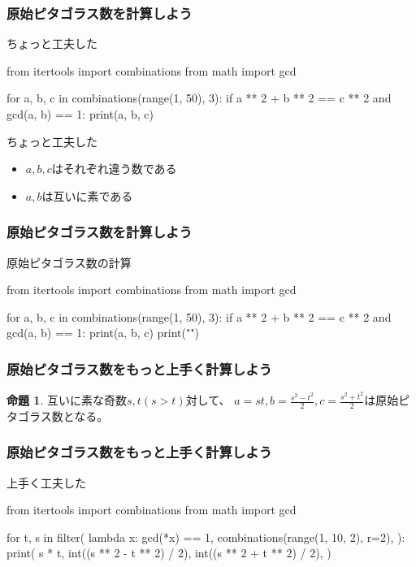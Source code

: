 \documentclass[dvipdfmx,11pt,notheorems]{beamer}
\theoremstyle{definition}
\newtheorem{proposition}{命題}
\begin{document}
\begin{frame}[fragile]\frametitle{原始ピタゴラス数を計算しよう}

\begin{block}{ちょっと工夫した}
\begin{pyverbatim}
from itertools import combinations
from math import gcd

for a, b, c in combinations(range(1, 50), 3):
    if a ** 2 + b ** 2 == c ** 2 and gcd(a, b) == 1:
        print(a, b, c)
\end{pyverbatim}
\end{block}

\begin{block}{ちょっと工夫した}
\begin{itemize}
\item $a,b,c$はそれぞれ違う数である
\item $a,b$は互いに素である
\end{itemize}
\end{block}

\end{frame}

\begin{frame}[fragile]\frametitle{原始ピタゴラス数を計算しよう}

\begin{block}{原始ピタゴラス数の計算}
\begin{pycode}
from itertools import combinations
from math import gcd

for a, b, c in combinations(range(1, 50), 3):
    if a ** 2 + b ** 2 == c ** 2 and gcd(a, b) == 1:
        print(a, b, c)
        print("\n")
\end{pycode}
\end{block}

\end{frame}


\begin{frame}\frametitle{原始ピタゴラス数をもっと上手く計算しよう}

\begin{proposition}
互いに素な奇数$s, t (s > t)$対して、 $a = st, b = \displaystyle \frac{s^{2}-t^{2}}{2}, c = \displaystyle \frac{s^{2}+t^{2}}{2}$は原始ピタゴラス数となる。
\end{proposition}

\end{frame}

\begin{frame}[fragile]\frametitle{原始ピタゴラス数をもっと上手く計算しよう}

\begin{block}{上手く工夫した}
\begin{pyverbatim}
from itertools import combinations
from math import gcd

for t, s in filter(
    lambda x: gcd(*x) == 1,
    combinations(range(1, 10, 2), r=2),
):
    print(
        s * t,
        int((s ** 2 - t ** 2) / 2),
        int((s ** 2 + t ** 2) / 2),
    )
\end{pyverbatim}
\end{block}

\end{frame}
\end{document}
